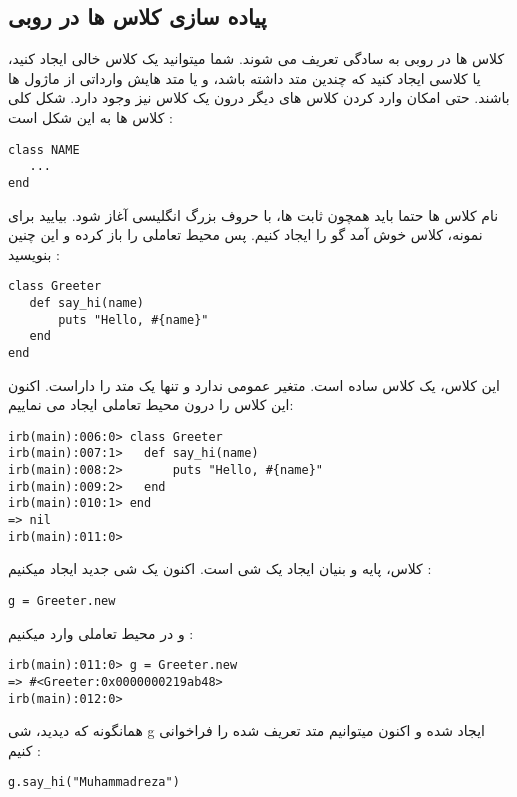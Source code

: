 \documentclass[11pt]{article}
\begin{document}
\subsection{پیاده سازی کلاس ها در روبی}
کلاس ها در روبی به سادگی تعریف می شوند. شما میتوانید یک کلاس خالی ایجاد کنید، یا کلاسی ایجاد کنید که چندین متد داشته باشد، و یا متد هایش وارداتی از ماژول ها باشند. حتی امکان وارد کردن کلاس های دیگر درون یک کلاس نیز وجود دارد. شکل کلی کلاس ها به این شکل است :
\begin{latin}
\begin{verbatim}
class NAME
   ...
end
\end{verbatim}
\end{latin}
نام کلاس ها حتما باید همچون ثابت ها، با حروف بزرگ انگلیسی آغاز شود. بیایید برای نمونه، کلاس خوش آمد گو را ایجاد کنیم. پس محیط تعاملی را باز کرده و این چنین بنویسید :
\begin{latin}
\begin{verbatim}
class Greeter
   def say_hi(name)
       puts "Hello, #{name}"
   end
end
\end{verbatim}
\end{latin}
این کلاس، یک کلاس ساده است. متغیر عمومی ندارد و تنها یک متد  را داراست. اکنون این کلاس را درون محیط تعاملی ایجاد می نماییم: 
\begin{latin}
\begin{verbatim}
irb(main):006:0> class Greeter
irb(main):007:1>   def say_hi(name)
irb(main):008:2>       puts "Hello, #{name}"
irb(main):009:2>   end
irb(main):010:1> end
=> nil
irb(main):011:0>
\end{verbatim}
\end{latin}
کلاس، پایه و بنیان ایجاد یک شی است. اکنون یک شی جدید ایجاد میکنیم :
\begin{latin}
\begin{verbatim}
g = Greeter.new
\end{verbatim}
\end{latin}
و در محیط تعاملی وارد میکنیم :
\begin{latin}
\begin{verbatim}
irb(main):011:0> g = Greeter.new
=> #<Greeter:0x0000000219ab48>
irb(main):012:0> 
\end{verbatim}
\end{latin}
همانگونه که دیدید، شی g ایجاد شده و اکنون میتوانیم متد تعریف شده را فراخوانی کنیم :
\begin{latin}
\begin{verbatim}
g.say_hi("Muhammadreza")
\end{verbatim}
\end{latin}
\end{document}
